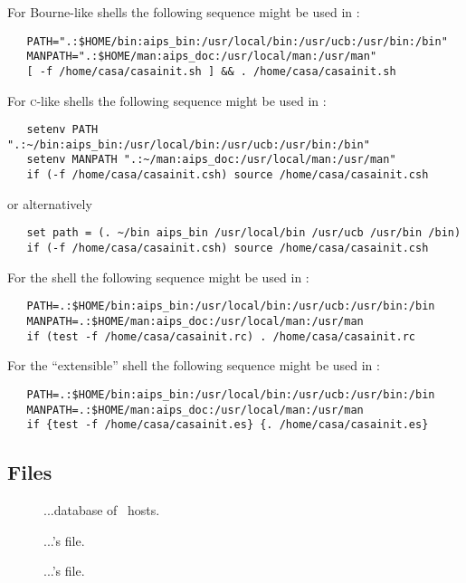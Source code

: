 \noindent
For Bourne-like shells the following sequence might be used in
:

\begin{verbatim}
   PATH=".:$HOME/bin:aips_bin:/usr/local/bin:/usr/ucb:/usr/bin:/bin"
   MANPATH=".:$HOME/man:aips_doc:/usr/local/man:/usr/man"
   [ -f /home/casa/casainit.sh ] && . /home/casa/casainit.sh
\end{verbatim}

\noindent
For \textsc{c}-like shells the following sequence might be used in
:

\begin{verbatim}
   setenv PATH ".:~/bin:aips_bin:/usr/local/bin:/usr/ucb:/usr/bin:/bin"
   setenv MANPATH ".:~/man:aips_doc:/usr/local/man:/usr/man"
   if (-f /home/casa/casainit.csh) source /home/casa/casainit.csh
\end{verbatim}

\noindent
or alternatively

\begin{verbatim}
   set path = (. ~/bin aips_bin /usr/local/bin /usr/ucb /usr/bin /bin)
   if (-f /home/casa/casainit.csh) source /home/casa/casainit.csh
\end{verbatim}

\noindent
For the  shell the following sequence might be used in
:

\begin{verbatim}
   PATH=.:$HOME/bin:aips_bin:/usr/local/bin:/usr/ucb:/usr/bin:/bin
   MANPATH=.:$HOME/man:aips_doc:/usr/local/man:/usr/man
   if (test -f /home/casa/casainit.rc) . /home/casa/casainit.rc
\end{verbatim}

\noindent
For the  ``extensible'' shell the following sequence might be used
in :

\begin{verbatim}
   PATH=.:$HOME/bin:aips_bin:/usr/local/bin:/usr/ucb:/usr/bin:/bin
   MANPATH=.:$HOME/man:aips_doc:/usr/local/man:/usr/man
   if {test -f /home/casa/casainit.es} {. /home/casa/casainit.es}
\end{verbatim}

\subsection*{Files}

\begin{description}
\item[]
...database of \aipspp\ hosts.

\item[]
...'s  file.

\item[]
...'s  file.
\end{description}

